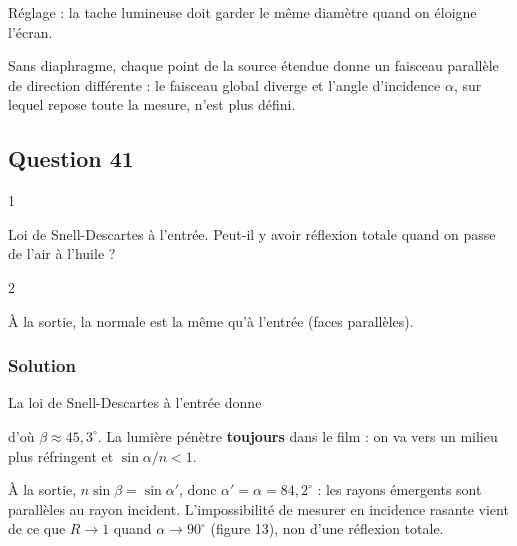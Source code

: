 \documentclass[11pt,a4paper]{article}
\newcommand{\equationajustee}[1]{%
  \sbox{\boiteequation}{$\displaystyle #1$}%
  \ifdim\wd\boiteequation>\linewidth
    \[\resizebox{\linewidth}{!}{\usebox{\boiteequation}}\]%
  \else
    \[#1\]%
  \fi}
\begin{document}
Réglage : la tache lumineuse doit garder le même diamètre quand on éloigne l'écran.

\begin{piege}

Sans diaphragme, chaque point de la source étendue donne un faisceau parallèle de direction différente : le faisceau global diverge et l'angle d'incidence \(\alpha\), sur lequel repose toute la mesure, n'est plus défini.

\end{piege}

\hypertarget{question-41}{%
\subsection{Question 41}\label{question-41}}

\begin{indication}{1}

Loi de Snell-Descartes à l'entrée. Peut-il y avoir réflexion totale quand on passe de l'air à l'huile ?

\end{indication}

\begin{indication}{2}

À la sortie, la normale est la même qu'à l'entrée (faces parallèles).

\end{indication}

\hypertarget{solution-40}{%
\subsubsection{Solution}\label{solution-40}}

La loi de Snell-Descartes à l'entrée donne

\equationajustee{\begin{aligned}
\sin\beta&=\frac{\sin\alpha}{n}\\
&=\frac{0{,}995}{1{,}4}\\
&=0{,}711,
\end{aligned}}

d'où \(\boxed{\beta\approx45{,}3^\circ}\). La lumière pénètre \textbf{toujours} dans le film : on va vers un milieu plus réfringent et \(\sin\alpha/n<1\).

À la sortie, \(n\sin\beta=\sin\alpha'\), donc \(\boxed{\alpha'=\alpha=84{,}2^\circ}\) : les rayons émergents sont parallèles au rayon incident. L'impossibilité de mesurer en incidence rasante vient de ce que \(R\to1\) quand \(\alpha\to90^\circ\) (figure 13), non d'une réflexion totale.
\end{document}
